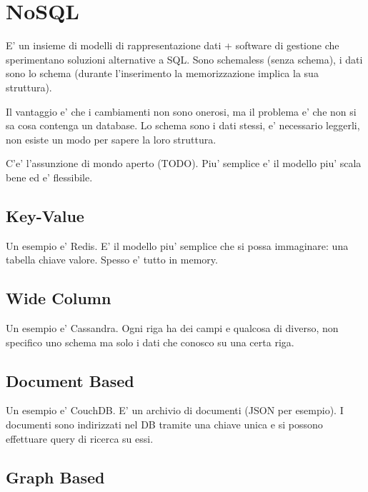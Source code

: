 
\section{NoSQL}

E' un insieme di modelli di rappresentazione dati + software di gestione che sperimentano soluzioni alternative a SQL.
Sono schemaless (senza schema), i dati sono lo schema (durante l'inserimento la memorizzazione implica la sua struttura).

Il vantaggio e' che i cambiamenti non sono onerosi, ma il problema e' che non si sa cosa contenga un database.
Lo schema sono i dati stessi, e' necessario leggerli, non esiste un modo per sapere la loro struttura.

C'e' l'assunzione di mondo aperto (TODO).
Piu' semplice e' il modello piu' scala bene ed e' flessibile.


\subsection{Key-Value}

Un esempio e' Redis. E' il modello piu' semplice che si possa immaginare: una tabella chiave valore.
Spesso e' tutto in memory.

\subsection{Wide Column}

Un esempio e' Cassandra. Ogni riga ha dei campi e qualcosa di diverso, non specifico uno schema ma solo i dati che conosco su una certa riga.


\subsection{Document Based}

Un esempio e' CouchDB. E' un archivio di documenti (JSON per esempio). I documenti sono indirizzati nel DB tramite una chiave unica e si possono effettuare query di ricerca su essi.


\subsection{Graph Based}

